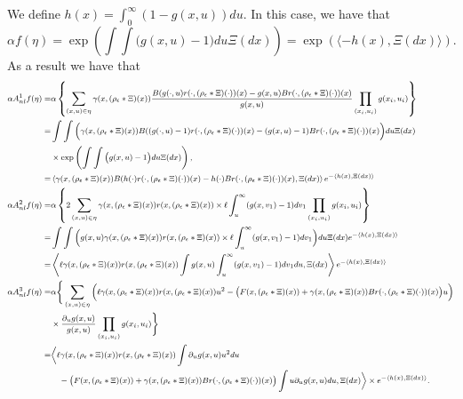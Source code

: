 \documentclass[12pt]{article}
\begin{document}
We define $h(x)=\int_{0}^{\infty} (1-g(x,u))du$. In this case, we have that $$\alpha f(\eta) = \exp \left(\int\int \big(g(x,u)-1\big) du \Xi(dx)\right)= \exp(\langle -h(x),\Xi(dx) \rangle ).$$  As a result we have that
\begin{equation}\label{Eq: Averaging the Non-local Scaling limit Lookdown Generator Part 1}
\footnotesize
\begin{aligned}
\alpha A^{1}_{nl}f(\eta )  =&
 \alpha \left\{\sum_{(x,u)\in\eta}\gamma(x, (\rho_{\epsilon}*\Xi)(x))\frac{B(g(\cdot,u)r( \cdot, (\rho_{\epsilon}* \Xi)(\cdot))(x)-g(x,u)Br( \cdot, (\rho_{\epsilon}* \Xi)(\cdot))(x)}{g(x,u)}\prod_{(x_i,u_i)}g(x_i,u_i)\right\}\\
 =&\int\int \bigg( \gamma(x, (\rho_{\epsilon}*\Xi)(x))B((g(\cdot,u)-1)r( \cdot, (\rho_{\epsilon}* \Xi)(\cdot))(x)-(g(x,u)-1)Br( \cdot, (\rho_{\epsilon}* \Xi)(\cdot))(x)\bigg)du \Xi(dx)\\
 &\times \exp \left(\int\int \big(g(x,u)-1\big) du \Xi(dx)\right),\\
 =& \left\langle \gamma(x, (\rho_{\epsilon}*\Xi)(x))B(h(\cdot) r( \cdot, (\rho_{\epsilon}* \Xi)(\cdot))(x)-h(\cdot)Br( \cdot, (\rho_{\epsilon}* \Xi)(\cdot))(x),\Xi(dx) \right\rangle e^{-\langle h(x),\Xi(dx)\rangle} \\
 \alpha A^{2}_{nl}f(\eta )  = &
   \alpha \left\{2\sum_{(x,u)\in\eta}\gamma(x, (\rho_{\epsilon}*\Xi)(x)) r(x, (\rho_{\epsilon}*\Xi)(x))\times \ell \int_u^{
\infty}(g(x,v_1)-1)dv_1\prod_{(x_i,u_i)}g(x_i,u_i)\right\}\\
=& \int\int \bigg(g(x,u)\gamma(x, (\rho_{\epsilon}*\Xi)(x)) r(x, (\rho_{\epsilon}*\Xi)(x))\times \ell \int_u^{
\infty}(g(x,v_1)-1)dv_1\bigg)du \Xi(dx)e^{-\langle h(x),\Xi(dx)\rangle}\\
=& 
\left\langle \ell \gamma(x, (\rho_{\epsilon}*\Xi)(x)) r(x, (\rho_{\epsilon}*\Xi)(x))\int g(x,u)\int_u^{
\infty}(g(x,v_1)-1)dv_1 du,\Xi(dx)\right\rangle e^{-\langle h(x),\Xi(dx)\rangle}\\
 \alpha A^{3}_{nl}f(\eta )  =&
\alpha \Bigg\{\sum_{(x,u)\in\eta}\bigg(\ell \gamma(x, (\rho_{\epsilon}*\Xi)(x)) r(x, (\rho_{\epsilon}*\Xi)(x)) u^2 -\big(F(x, (\rho_{\epsilon}*\Xi)(x))+\gamma(x, (\rho_{\epsilon}*\Xi)(x))Br( \cdot, (\rho_{\epsilon}* \Xi)(\cdot))(x)\big)u\bigg)\\
&\times \frac {\partial_u g(x,u)}{g(x,u)}\prod_{(x_i,u_i)}g(x_i,u_i)\Bigg\}\\
=& \bigg \langle \ell \gamma(x, (\rho_{\epsilon}*\Xi)(x)) r(x, (\rho_{\epsilon}*\Xi)(x))\int \partial_u g(x,u) u^2 du \\
& ~~~ - \big(F(x, (\rho_{\epsilon}*\Xi)(x))+\gamma(x, (\rho_{\epsilon}*\Xi)(x))Br( \cdot, (\rho_{\epsilon}* \Xi)(\cdot))(x)\big) \int u \partial_u g(x,u) du ,\Xi(dx)\bigg\rangle \times e^{-\langle h(x),\Xi(dx)\rangle} .
 \end{aligned}    
\end{equation}
\end{document}
